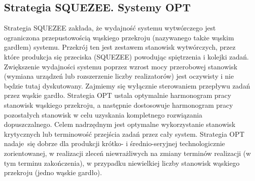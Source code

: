 \documentclass[10pt, a
4paper]{article}
\begin{document}
\subsection{Strategia SQUEZEE. Systemy OPT}
Strategia SQUEZEE zakłada, że wydajność systemu wytwórczego jest ograniczona przepustowością wąskiego przekroju (nazywanego także wąskim gardłem) systemu. Przekrój ten jest zestawem stanowisk wytwórczych, przez które produkcja się przeciska (SQUEZEE) powodując spiętrzenia i kolejki zadań. Zwiększenie wydajności systemu poprzez wzrost mocy przerobowej stanowisk (wymiana urządzeń lub rozszerzenie liczby realizatorów) jest oczywisty i nie będzie tutaj dyskutowany. Zajmiemy się wyłącznie sterowaniem przepływu zadań przez wąskie gardło. Strategia OPT ustala optymalnie harmonogram pracy stanowisk wąskiego przekroju, a następnie dostosowuje harmonogram pracy pozostałych stanowisk w celu uzyskania kompletnego rozwiązania dopuszczalnego. Celem nadrzędnym jest optymalne wykorzystanie stanowisk krytycznych lub terminowość przejścia zadań przez cały system. Strategia OPT nadaje~się dobrze dla produkcji krótko- i średnio-seryjnej technologicznie zorientowanej, w realizacji zleceń niewrażliwych na zmiany terminów realizacji (w tym terminu zakończenia), w przypadku niewielkiej liczby stanowisk wąskiego przekroju (jedno wąskie gardło). %

\newpage
\end{document}
